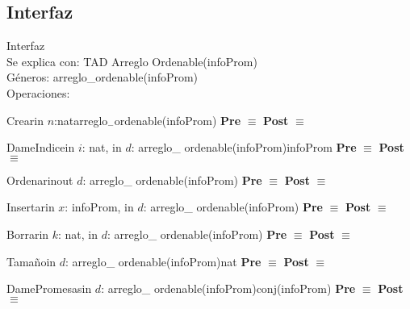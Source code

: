 \subsection{Interfaz}
	\noindent Interfaz \\
	Se explica con: TAD Arreglo Ordenable(infoProm)\\
	G\'{e}neros: arreglo\_ordenable(infoProm)\\
	Operaciones:\\
	\begin{interfaz}{Crear}{in $n$:nat}{arreglo$_-$ordenable(infoProm)}{}
	\textbf{Pre} $\equiv$
	\textbf{Post} $\equiv$
	\end{interfaz}
	
	\begin{interfaz}{DameIndice}{in $i$: nat, in $d$: arreglo\_ ordenable(infoProm)}{infoProm}{}
	\textbf{Pre} $\equiv$
	\textbf{Post} $\equiv$
	\end{interfaz}
	
	\begin{interfaz}{Ordenar}{inout $d$: arreglo\_ ordenable(infoProm)}{}{}
	\textbf{Pre} $\equiv$
	\textbf{Post} $\equiv$
	\end{interfaz}
	
	\begin{interfaz}{Insertar}{in $x$: infoProm, in $d$: arreglo\_ ordenable(infoProm)}{}{}
	\textbf{Pre} $\equiv$
	\textbf{Post} $\equiv$
	\end{interfaz}
	
	\begin{interfaz}{Borrar}{in $k$: nat, in $d$: arreglo\_ ordenable(infoProm)}{}{}
	\textbf{Pre} $\equiv$
	\textbf{Post} $\equiv$
	\end{interfaz}
	
	\begin{interfaz}{Tama\~no}{in $d$: arreglo\_ ordenable(infoProm)}{nat}{}
	\textbf{Pre} $\equiv$
	\textbf{Post} $\equiv$
	\end{interfaz}

	\begin{interfaz}{DamePromesas}{in $d$: arreglo\_ ordenable(infoProm)}{conj(infoProm)}{}
	\textbf{Pre} $\equiv$
	\textbf{Post} $\equiv$
	\end{interfaz}
	

